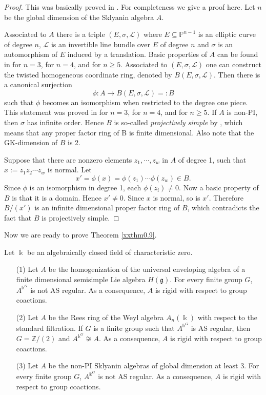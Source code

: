 \begin{proof} This was basically proved in \cite[Corollary 6.]{KKZ1}.
For completeness we give a proof here. Let $n$ be the global 
dimension of the Sklyanin algebra $A$. 

Associated to $A$ there is a triple $(E, \sigma, {\mathcal L})$ 
where $E \subseteq {\mathbb P}^{n-1}$ is an elliptic curve of
degree $n$, ${\mathcal  L}$ is an invertible line bundle over 
$E$ of degree $n$ and $\sigma$ is an automorphism of $E$ induced 
by a translation. Basic properties of $A$ can be found in 
\cite{ATV} for $n = 3$, \cite{SS} for $n = 4$, and \cite{TV} 
for $n \geq 5$. Associated to $(E, \sigma,{\mathcal L})$ one can
construct the twisted homogeneous coordinate ring, denoted by 
$B(E, \sigma,{\mathcal L})$. Then there is a canonical surjection
$$\phi: A \to  B(E, \sigma,{\mathcal L}) =: B$$
such that $\phi$ becomes an isomorphism when restricted to the degree 
one piece. This statement was proved in 
\cite[Section 6]{ATV} for $n = 3$, \cite[Lemma 3.3]{SS} for $n = 4$,
and \cite[(4.3)]{TV} for $n \geq 5$. If $A$ is non-PI, then $\sigma$ 
has infinite order. Hence $B$ is so-called {\it projectively simple} 
by \cite{RRZ1}, which means that any proper factor ring of B is finite
dimensional. Also note that the GK-dimension of $B$ is 2.

Suppose that there are nonzero elements $z_1,\cdots,z_w$ in $A$ of 
degree 1, such that $x:=z_1 z_2\cdots z_w$ is normal. Let 
$$x'=\phi(x)=\phi(z_1)\cdots \phi(z_w)\in B.$$ 
Since $\phi$ is an isomorphism in degree 1, each $\phi(z_i)\neq 0$. 
Now a basic property of $B$ is that it is a domain. Hence 
$x'\neq 0$. Since $x$ is normal, so is $x'$. Therefore $B/(x')$ is
an infinite dimensional proper factor ring of $B$, which contradicts 
the fact that $B$ is projectively simple.
\end{proof}

Now we are ready to prove Theorem \ref{xxthm0.9}.

\begin{theorem}
\label{xxthm5.6}
Let $\Bbbk$ be an algebraically closed field of characteristic zero. 
\begin{enumerate}
\item[(1)]
Let $A$ be the homogenization of the universal
enveloping algebra of a finite dimensional semisimple Lie algebra 
$H({\mathfrak g})$. For every finite group $G$, $A^{\Bbbk^G}$ 
is not AS regular. As a consequence, $A$ is rigid with respect to 
group coactions.
\item[(2)]
Let $A$ be the Rees ring of the Weyl algebra $A_n(\Bbbk)$ with respect 
to the standard filtration. If $G$ is a finite group such that
$A^{\Bbbk^G}$ is AS regular, then $G={\mathbb Z}/(2)$ and 
$A^{\Bbbk^G}\not\cong A$. As a consequence, $A$ is rigid with respect to 
group coactions.
\item[(3)]
Let $A$ be the non-PI Sklyanin algebras of global dimension at least 3.
For every finite group $G$, $A^{\Bbbk^G}$ 
is not AS regular. As a consequence, $A$ is rigid with respect to 
group coactions.
\end{enumerate}
\end{theorem}

